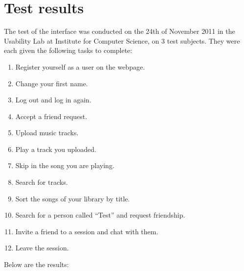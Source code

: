 \section{Test results}

The test of the interface was conducted on the 24th of November 2011 in the Usability Lab at Institute for Computer Science, on 3 test subjects.
They were each given the following tasks to complete:
\begin{enumerate}
	\item Register yourself as a user on the webpage.
	\item Change your first name.
	\item Log out and log in again.
	\item Accept a friend request.
	\item Upload music tracks.
	\item Play a track you uploaded.
	\item Skip in the song you are playing.
	\item Search for tracks.
	\item Sort the songs of your library by title.
	\item Search for a person called ``Test'' and request friendship.
	\item Invite a friend to a session and chat with them. 
	\item Leave the session.
\end{enumerate}

Below are the results:


